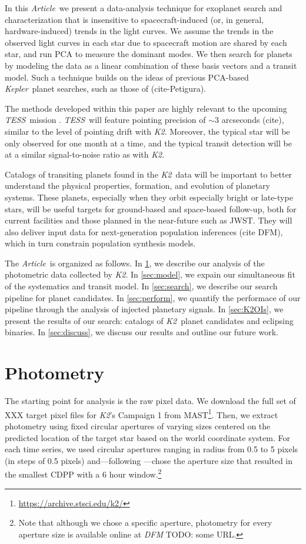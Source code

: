\documentclass[12pt,preprint]{aastex}
\newcommand{\project}[1]{\textsl{#1}} %
\newcommand{\kepler}{\project{Kepler}}
\newcommand{\KT}{\project{K2}}
\newcommand{\tess}{\project{TESS}}
\newcommand{\paper}{\textsl{Article}}
\newcommand{\todo}[3]{{\color{#2} \emph{#1} TODO: #3}}
\newcommand{\dfmtodo}[1]{\todo{DFM}{red}{#1}}
\begin{document}
In this \paper\ we present a
data-analysis technique for exoplanet search and characterization that
is insensitive to spacecraft-induced (or, in general,
hardware-induced) trends in the light curves.
We assume the trends in the observed light curves in each star due to
spacecraft motion are shared by each star, and run PCA to measure the dominant
modes.
We then search for planets by modeling the data as a linear combination of
these basis vectors and a transit model.
Such a technique builds on the ideas of previous PCA-based \kepler\ planet
searches, such as those of (cite-Petigura).

The methods developed within this paper are highly relevant to the upcoming
\tess\ mission \citep{Ricker:2014}.
\tess\ will feature pointing precision of $\sim 3$ arcseconds (cite),
similar to the level of pointing drift with \KT.
Moreover, the typical star will be only observed for one month at a time, and
the typical transit detection will be at a similar signal-to-noise ratio as
with \KT.

Catalogs of transiting planets found in the \KT\ data will be important to better
understand the physical properties, formation, and evolution of planetary systems.
These planets, especially when they orbit especially bright or late-type stars,
will be useful targets for ground-based and space-based follow-up, both for
current facilities and those planned in the near-future such as JWST.
They will also deliver input data for next-generation population inferences (cite DFM),
which in turn constrain population synthesis models.

The \paper\ is organized as follows.
In \textsection\ref{sec:phot}, we describe our analysis of the photometric
data collected by \KT.
In \textsection\ref{sec:model}, we expain our simultaneous fit of the
systematics and transit model.
In \textsection\ref{sec:search}, we describe our search pipeline for
planet candidates.
In \textsection\ref{sec:perform}, we quantify the performace of our pipeline
through the analysis of injected planetary signals.
In \textsection\ref{sec:K2OIs}, we present the results of our search:
catalogs of \KT\ planet candidates and eclipsing binaries.
In \textsection\ref{sec:discuss}, we discuss our results and outline our
future work.


\section{Photometry}
\label{sec:phot}

The starting point for analysis is the raw pixel data.
We download the full set of XXX target pixel files for \KT's Campaign 1 from
MAST\footnote{\url{https://archive.stsci.edu/k2/}}.
Then, we extract photometry using fixed circular apertures of varying sizes
centered on the predicted location of the target star based on the world
coordinate system.
For each time series, we used circular apertures ranging in radius from 0.5 to
5 pixels (in steps of 0.5 pixels) and---following
\citet{Vanderburg:2014}---chose the aperture size that resulted in the
smallest CDPP \citep{cdpp}
with a 6 hour window.\footnote{Note that although we chose a specific
aperture, photometry for every aperture size is available online at
\dfmtodo{some URL}.}
\end{document}
